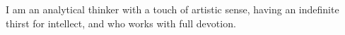 

\begin{cvparagraph}

I am an analytical thinker with a touch of artistic sense, having an indefinite thirst for intellect, and who works with full devotion.
\end{cvparagraph}
